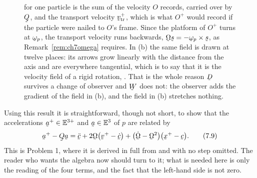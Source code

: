 \begin{figure}[htbp]
{for one particle is the sum of the velocity $O$ records, carried over by
$\bQ$, and the transport velocity $\bv^{+}_{\text{tr}}$, which is what
$O^{+}$ would record if the particle were nailed to $O$'s frame. Since
the platform of $O^{+}$ turns at $\bom_{p}$, the transport velocity runs
backwards, $\bOm\bs=-\bom_{p}\times\bs$, as
Remark~\ref{rem:ch7omega} requires. In (b) the same field is drawn at
twelve places: its arrows grow linearly with the distance from the axis
and are everywhere tangential, which is to say that it is the velocity
field of a rigid rotation, . That is the whole reason $\bD$
survives a change of observer and $\bW$ does not: the observer adds the
gradient of the field in (b), and the field in (b) stretches nothing.}
\label{fig:ch7transport}
\end{figure}

Using this result it is straightforward, though not short, to show that
the accelerations $\ba^{+}\in\mathbb{E}^{3+}$ and $\ba\in\Et$ of $p$ are
related by
\begin{equation}
   \ba^{+}-\bQ\ba=\ddot\bc+2\bOm\big(\bv^{+}-\dot\bc\big)
   +\big(\dot\bOm-\bOm^{2}\big)\big(\bx^{+}-\bc\big).
   \tag{7.9}\label{eq:7.9}
\end{equation}
This is Problem 1, where it is derived in full from  and
 with no step omitted. The reader who wants the algebra now
should turn to it; what is needed here is only the reading of the four
terms, and the fact that the left-hand side is not zero.

